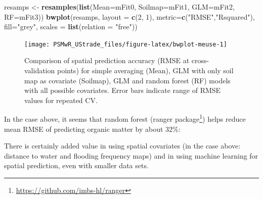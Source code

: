 \documentclass[graybox,natbib,nospthms,UStrade]{svmono}
\newenvironment{Shaded}{\begin{snugshade}}{\end{snugshade}}
\newcommand{\CommentTok}[1]{\textcolor[rgb]{0.37,0.37,0.37}{\textit{#1}}}
\newcommand{\DataTypeTok}[1]{\textcolor[rgb]{0.27,0.27,0.27}{#1}}
\newcommand{\DecValTok}[1]{\textcolor[rgb]{0.06,0.06,0.06}{#1}}
\newcommand{\KeywordTok}[1]{\textcolor[rgb]{0.27,0.27,0.27}{\textbf{#1}}}
\newcommand{\NormalTok}[1]{#1}
\newcommand{\OperatorTok}[1]{\textcolor[rgb]{0.43,0.43,0.43}{\textbf{#1}}}
\newcommand{\StringTok}[1]{\textcolor[rgb]{0.5,0.5,0.5}{#1}}
\renewcommand{\href}[2]{#2 (\url{#1})}
\renewcommand{\href}[2]{#2\footnote{\url{#1}}}
\begin{document}
\begin{Shaded}
\begin{Highlighting}[]
\NormalTok{resamps <-}\StringTok{ }\KeywordTok{resamples}\NormalTok{(}\KeywordTok{list}\NormalTok{(}\DataTypeTok{Mean=}\NormalTok{mFit0, }\DataTypeTok{Soilmap=}\NormalTok{mFit1, }\DataTypeTok{GLM=}\NormalTok{mFit2, }\DataTypeTok{RF=}\NormalTok{mFit3))}
\KeywordTok{bwplot}\NormalTok{(resamps, }\DataTypeTok{layout =} \KeywordTok{c}\NormalTok{(}\DecValTok{2}\NormalTok{, }\DecValTok{1}\NormalTok{), }\DataTypeTok{metric=}\KeywordTok{c}\NormalTok{(}\StringTok{"RMSE"}\NormalTok{,}\StringTok{"Rsquared"}\NormalTok{), }
       \DataTypeTok{fill=}\StringTok{"grey"}\NormalTok{, }\DataTypeTok{scales =} \KeywordTok{list}\NormalTok{(}\DataTypeTok{relation =} \StringTok{"free"}\NormalTok{))}
\end{Highlighting}
\end{Shaded}

\begin{figure}[H]

{\centering \texttt{[image: PSMwR\_UStrade\_files/figure-latex/bwplot-meuse-1]} 

}

\caption{Comparison of spatial prediction accuracy (RMSE at cross-validation points) for simple averaging (Mean), GLM with only soil map as covariate (Soilmap), GLM and random forest (RF) models with all possible covariates. Error bars indicate range of RMSE values for repeated CV.}\label{fig:bwplot-meuse}
\end{figure}

In the case above, it seems that random forest (\href{https://github.com/imbs-hl/ranger}{ranger package}) helps reduce mean RMSE of predicting organic matter by about 32\%:

\begin{Shaded}
\end{Shaded}

There is certainly added value in using spatial covariates (in the case above: distance to water and flooding frequency maps) and in using machine learning for spatial prediction, even with smaller data sets.
\end{document}
